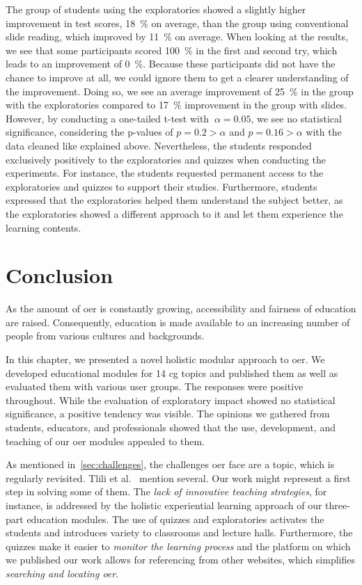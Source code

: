 The group of students using the exploratories showed a slightly higher improvement in test scores, 18~\% on average, than the group using conventional slide reading, which improved by 11~\% on average. When looking at the results, we see that some participants scored 100~\% in the first and second try, which leads to an improvement of 0~\%. Because these participants did not have the chance to improve at all, we could ignore them to get a clearer understanding of the improvement. Doing so, we see an average improvement of 25~\% in the group with the exploratories compared to 17~\% improvement in the group with slides. However, by conducting a one-tailed t-test with \(\ \alpha=0.05\), we see no statistical significance, considering the p-values of \(p=0.2>\alpha\) and \(p=0.16>\alpha\) with the data cleaned like explained above.
Nevertheless, the students responded exclusively positively to the exploratories and quizzes when conducting the experiments. For instance, the students requested permanent access to the exploratories and quizzes to support their studies. Furthermore, students expressed that the exploratories helped them understand the subject better, as the exploratories showed a different approach to it and let them experience the learning contents.


\section{Conclusion} %
As the amount of \acrshort{oer} is constantly growing, accessibility and fairness of education are raised. Consequently, education is made available to an increasing number of people from various cultures and backgrounds.

In this chapter, we presented a novel holistic modular approach to \acrshort{oer}. We developed educational modules for 14 \acrshort{cg} topics and published them as well as evaluated them with various user groups. The responses were positive throughout. While the evaluation of exploratory impact showed no statistical significance, a positive tendency was visible. The opinions we gathered from students, educators, and professionals showed that the use, development, and teaching of our \acrshort{oer} modules appealed to them.

As mentioned in~\autoref{sec:challenges}, the challenges \acrshort{oer} face are a topic, which is regularly revisited. Tlili et al.~\cite{tlili:2021:towards} mention several. Our work might represent a first step in solving some of them. The \emph{lack of innovative teaching strategies}, for instance, is addressed by the holistic experiential learning approach of our three-part education modules. The use of quizzes and exploratories activates the students and introduces variety to classrooms and lecture halls. Furthermore, the quizzes make it easier to \emph{monitor the learning process} and the platform on which we published our work allows for referencing from other websites, which simplifies \emph{searching and locating \acrshort{oer}}.



